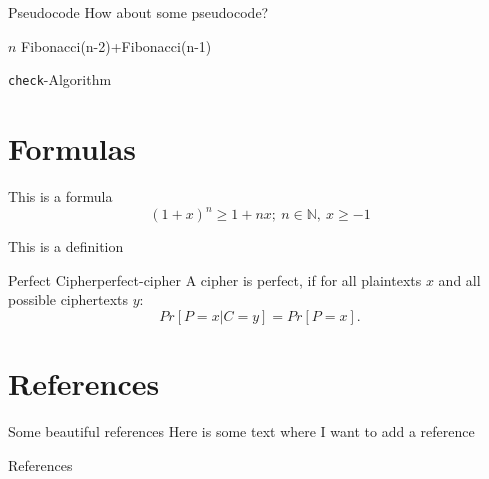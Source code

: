 \documentclass[aspectratio=169]{beamer}
\begin{document}
\begin{frame}{Pseudocode}
	\Large
	How about some pseudocode?

	\begin{algorithm}[H]
	\begin{algorithmic}[1]
				\Return $n$
			\Else
				\Return Fibonacci(n-2)+Fibonacci(n-1)
			\EndIf

		\EndFunction
	\end{algorithmic}

	\caption{\texttt{check}-Algorithm}
	\label{alg-check}
	\end{algorithm}

\end{frame}

\section{Formulas}

\begin{frame}{This is a formula}
	$$(1+x)^n \geq 1 + nx; ~ n \in \mathbb{N},~ x\geq -1$$
\end{frame}

\begin{frame}{This is a definition}
	\begin{customdefinition}{Perfect Cipher}{perfect-cipher}
		A cipher is perfect, if for all plaintexts $x$ and all possible ciphertexts
		$y$:
		$$Pr[P=x|C=y]=Pr[P=x].$$
	\end{customdefinition}
\end{frame}


\section{References}

\begin{frame}{Some beautiful references}
	Here is some text where I want to add a reference \cite{Dittrich19}
\end{frame}

\begin{frame}{References}
    
    
\end{frame}
\end{document}
